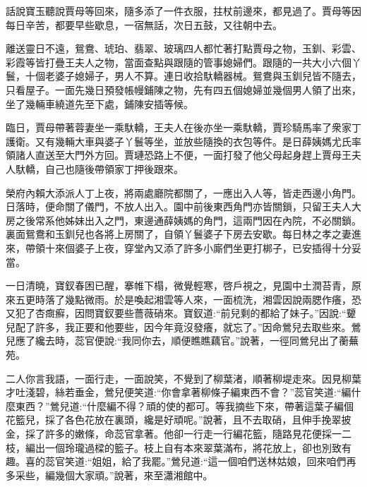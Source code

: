 

\begin{parag}
    話說寶玉聽說賈母等回來，隨多添了一件衣服，拄杖前邊來，都見過了。賈母等因每日辛苦，都要早些歇息，一宿無話，次日五鼓，又往朝中去。
\end{parag}


\begin{parag}
    離送靈日不遠，鴛鴦、琥珀、翡翠、玻璃四人都忙著打點賈母之物，玉釧、彩雲、彩霞等皆打疊王夫人之物，當面查點與跟隨的管事媳婦們。跟隨的一共大小六個丫鬟，十個老婆子媳婦子，男人不算。連日收拾馱轎器械。鴛鴦與玉釧兒皆不隨去，只看屋子。一面先幾日預發帳幔鋪陳之物，先有四五個媳婦並幾個男人領了出來，坐了幾輛車繞道先至下處，鋪陳安插等候。
\end{parag}


\begin{parag}
    臨日，賈母帶著蓉妻坐一乘馱轎，王夫人在後亦坐一乘馱轎，賈珍騎馬率了衆家丁護衛。又有幾輛大車與婆子丫鬟等坐，並放些隨換的衣包等件。是日薛姨媽尤氏率領諸人直送至大門外方回。賈璉恐路上不便，一面打發了他父母起身趕上賈母王夫人馱轎，自己也隨後帶領家丁押後跟來。
\end{parag}


\begin{parag}
    榮府內賴大添派人丁上夜，將兩處廳院都關了，一應出入人等，皆走西邊小角門。日落時，便命關了儀門，不放人出入。園中前後東西角門亦皆關鎖，只留王夫人大房之後常系他姊妹出入之門，東邊通薛姨媽的角門，這兩門因在內院，不必關鎖。裏面鴛鴦和玉釧兒也各將上房關了，自領丫鬟婆子下房去安歇。每日林之孝之妻進來，帶領十來個婆子上夜，穿堂內又添了許多小廝們坐更打梆子，已安插得十分妥當。
\end{parag}


\begin{parag}
    一日清曉，寶釵春困已醒，搴帷下榻，微覺輕寒，啓戶視之，見園中土潤苔青，原來五更時落了幾點微雨。於是喚起湘雲等人來，一面梳洗，湘雲因說兩腮作癢，恐又犯了杏癍癬，因問寶釵要些薔薇硝來。寶釵道:“前兒剩的都給了妹子。”因說:“顰兒配了許多，我正要和他要些，因今年竟沒發癢，就忘了。”因命鶯兒去取些來。鶯兒應了纔去時，蕊官便說:“我同你去，順便瞧瞧藕官。”說著，一徑同鶯兒出了蘅蕪苑。
\end{parag}


\begin{parag}
    二人你言我語，一面行走，一面說笑，不覺到了柳葉渚，順著柳堤走來。因見柳葉才吐淺碧，絲若垂金，鶯兒便笑道:“你會拿著柳條子編東西不會？”蕊官笑道:“編什麼東西？”鶯兒道:“什麼編不得？頑的使的都可。等我摘些下來，帶著這葉子編個花籃兒，採了各色花放在裏頭，纔是好頑呢。”說著，且不去取硝，且伸手挽翠披金，採了許多的嫩條，命蕊官拿著。他卻一行走一行編花籃，隨路見花便採一二枝，編出一個玲瓏過樑的籃子。枝上自有本來翠葉滿布，將花放上，卻也別致有趣。喜的蕊官笑道:“姐姐，給了我罷。”鶯兒道:“這一個咱們送林姑娘，回來咱們再多采些，編幾個大家頑。”說著，來至瀟湘館中。
\end{parag}


